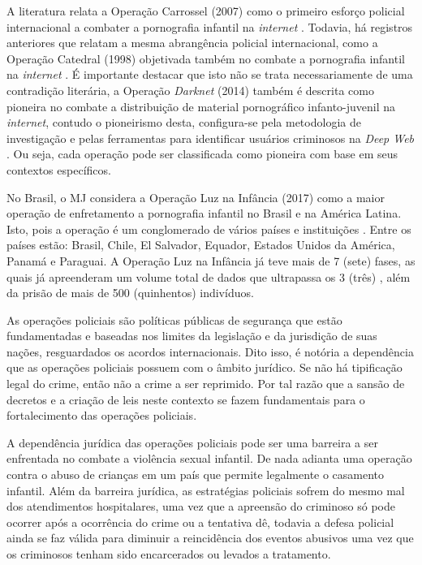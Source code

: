 A literatura relata a Operação Carrossel (2007) como o primeiro esforço policial internacional a combater a pornografia infantil na \textit{internet} \cite{lowenkron2014all}. Todavia, há registros anteriores que relatam a mesma abrangência policial internacional, como a Operação Catedral (1998) objetivada também no combate a pornografia infantil na \textit{internet} \cite{barrot2008brochuras, jesus2006anti}. É importante destacar que isto não se trata necessariamente de uma contradição literária, a Operação \textit{Darknet} (2014) também é descrita como pioneira no combate a distribuição de material pornográfico infanto-juvenil na \textit{internet}, contudo o pioneirismo desta, configura-se pela metodologia de investigação e pelas ferramentas para identificar usuários criminosos na \textit{Deep Web} \cite{tonello2018pedofilia}. Ou seja, cada operação pode ser classificada como pioneira com base em seus contextos específicos. 

No Brasil, o \ac{MJ} considera a Operação Luz na Infância (2017) como a maior operação de enfretamento a pornografia infantil no Brasil e na América Latina. Isto, pois a operação é um conglomerado de vários países e instituições \cite{souza2018sabemos}. Entre os países estão: Brasil, Chile, El Salvador, Equador, Estados Unidos da América, Panamá e Paraguai. A Operação Luz na Infância já teve mais de 7 (sete) fases, as quais já apreenderam um volume total de dados que ultrapassa os 3 (três) , além da prisão de mais de 500 (quinhentos) indivíduos. 

As operações policiais são políticas públicas de segurança que estão fundamentadas e baseadas nos limites da legislação e da jurisdição de suas nações, resguardados os acordos internacionais. Dito isso, é notória a dependência que as operações policiais possuem com o âmbito jurídico. Se não há tipificação legal do crime, então não a crime a ser reprimido. Por tal razão que a sansão de decretos e a criação de leis neste contexto se fazem fundamentais para o fortalecimento das operações policiais. 

A dependência jurídica das operações policiais pode ser uma barreira a ser enfrentada no combate a violência sexual infantil. De nada adianta uma operação contra o abuso de crianças em um país que permite legalmente o casamento infantil. Além da barreira jurídica, as estratégias policiais sofrem do mesmo mal dos atendimentos hospitalares, uma vez que a apreensão do criminoso só pode ocorrer após a ocorrência do crime ou a tentativa dê, todavia a defesa policial ainda se faz válida para diminuir a reincidência dos eventos abusivos uma vez que os criminosos tenham sido encarcerados ou levados a tratamento. 

